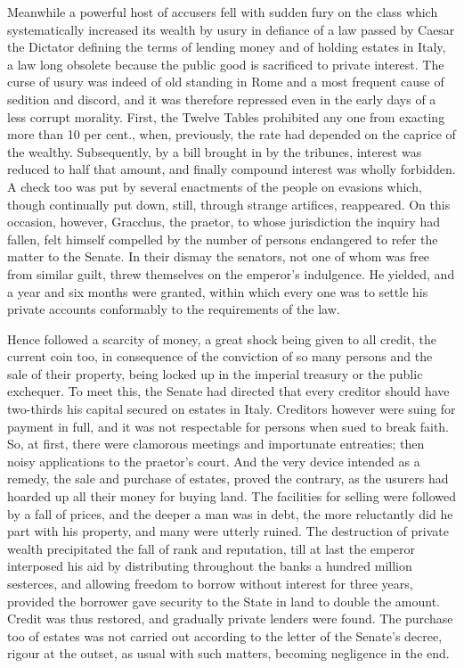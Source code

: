 
Meanwhile a powerful host of accusers fell with sudden fury on the class which systematically increased its wealth by usury in defiance of a law passed by Caesar the Dictator defining the terms of lending money and of holding estates in Italy, a law long obsolete because the public good is sacrificed to private interest. The curse of usury was indeed of old standing in Rome and a most frequent cause of sedition and discord, and it was therefore repressed even in the early days of a less corrupt morality. First, the Twelve Tables prohibited any one from exacting more than 10 per cent., when, previously, the rate had depended on the caprice of the wealthy. Subsequently, by a bill brought in by the tribunes, interest was reduced to half that amount, and finally compound interest was wholly forbidden. A check too was put by several enactments of the people on evasions which, though continually put down, still, through strange artifices, reappeared. On this occasion, however, Gracchus, the praetor, to whose jurisdiction the inquiry had fallen, felt himself compelled by the number of persons endangered to refer the matter to the Senate. In their dismay the senators, not one of whom was free from similar guilt, threw themselves on the emperor's indulgence. He yielded, and a year and six months were granted, within which every one was to settle his private accounts conformably to the requirements of the law.


Hence followed a scarcity of money, a great shock being given to all credit, the current coin too, in consequence of the conviction of so many persons and the sale of their property, being locked up in the imperial treasury or the public exchequer. To meet this, the Senate had directed that every creditor should have two-thirds his capital secured on estates in Italy. Creditors however were suing for payment in full, and it was not respectable for persons when sued to break faith. So, at first, there were clamorous meetings and importunate entreaties; then noisy applications to the praetor's court. And the very device intended as a remedy, the sale and purchase of estates, proved the contrary, as the usurers had hoarded up all their money for buying land. The facilities for selling were followed by a fall of prices, and the deeper a man was in debt, the more reluctantly did he part with his property, and many were utterly ruined. The destruction of private wealth precipitated the fall of rank and reputation, till at last the emperor interposed his aid by distributing throughout the banks a hundred million sesterces, and allowing freedom to borrow without interest for three years, provided the borrower gave security to the State in land to double the amount. Credit was thus restored, and gradually private lenders were found. The purchase too of estates was not carried out according to the letter of the Senate's decree, rigour at the outset, as usual with such matters, becoming negligence in the end.

